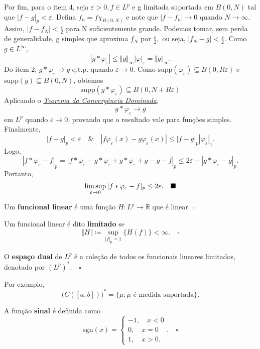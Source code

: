 \documentclass[measure_theory.tex]{subfiles}
\begin{document}
\begin{proof*}
	Por fim, para o item 4, seja \(\varepsilon > 0, f\in L^{p}\) e g limitada suportada em \(B(0, N)\) tal que \(|f-g|_{p}< \varepsilon .\) Defina \(f_{n} = f\chi_{B(0, N)}\) e note que \(|f-f_{n}|\to 0\) quando \(N\to \infty\). Assim,
	\(|f-f_{N}|<\frac{\varepsilon }{2}\) para N suficientemente grande. Podemos tomar, sem perda de generalidade, g simples que aproxima \(f_{N}\) por \(\frac{\varepsilon }{2},\) ou seja, \(|f_{N}-g|<\frac{\varepsilon }{2}\). Como \(g\in L^{\infty}\),
	\[
		|g*\varphi_{\varepsilon }|\leq \Vert g \Vert_{\infty}|\varphi |_{\varepsilon } = \Vert g \Vert_{\infty}.
	\]
	Do item 2, \(g*\varphi_{\varepsilon }\to g\) q.t.p. quando \(\varepsilon \to 0\). Como \(\mathrm{supp}(\varphi_{\varepsilon })\subseteq B(0, R\varepsilon )\) e \(\mathrm{supp}(g)\subseteq B(0, N)\), obtemos
	\[
		\mathrm{supp}(g*\varphi_{\varepsilon })\subseteq B(0, N + R\varepsilon )
	\]
	Aplicando o \hyperlink{dominated_convergence}{\textit{Teorema da Convergência Dominada}},
	\[
		g*\varphi_{\varepsilon }\to g
	\]
	em \(L^{p}\) quando \(\varepsilon \to 0\), provando que o resultado vale para funções simples. Finalmente,
	\[
		|f-g|_{p} <\varepsilon \quad\&\quad |f \varphi_{\varepsilon }(x) - g \varphi_{\varepsilon }(x)| \leq |f-g|_{p}|\varphi_{\varepsilon }|_{1}.
	\]
	Logo,
	\[
		|f*\varphi_{\varepsilon } - f|_{p} = |f*\varphi_{\varepsilon } - g*\varphi_{\varepsilon } + g*\varphi_{\varepsilon } + g - g - f|_{p}\leq 2\varepsilon + |g*\varphi_{\varepsilon }-g|_{p}.
	\]
	Portanto,
	\[
		\limsup_{\varepsilon \to 0}|f*\varphi_{\varepsilon }-f|_p \leq 2\varepsilon.\quad \text{$\blacksquare$}
	\]
\end{proof*}
\begin{def*}
	Um \textbf{funcional linear} é uma função \(H:L^{p}\rightarrow \mathbb{R}\) que é linear. \(\square\)
\end{def*}
\begin{def*}
	Um funcional linear é dito \textbf{limitado} se
	\[
		\Vert H \Vert\coloneqq \sup_{|f|_{p}=1}\{H(f)\} < \infty.\quad \square
	\]
\end{def*}
\begin{def*}
	O \textbf{espaço dual} de \(L^{p}\) é a coleção de todos os funcionais lineares limitados, denotado por \((L^{p})^{*}.\quad \square\)
\end{def*}
\begin{example}
	Por exemplo,
	\[
		\biggl(C([a, b])\biggr)^{*} = \{\mu : \mu \text{ é medida suportada}\}.
	\]
\end{example}
\begin{def*}
	A função \textbf{sinal} é definida como
	\[
		\mathrm{sgn}(x)  = \left\{\begin{array}{ll}
			-1,\quad x < 0 \\
			0,\quad x = 0  \\
			1,\quad x > 0.
		\end{array}\right..\quad \square
	\]
\end{def*}
\end{document}
